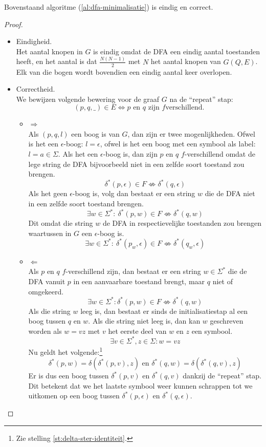 \documentclass[main.tex]{subfiles}
\begin{document}
\begin{st}
  Bovenstaand algoritme (\ref{al:dfa-minimalisatie}) is eindig en correct.
  \begin{proof}
    \begin{itemize}
    \item Eindigheid.\\
    Het aantal knopen in $G$ is eindig omdat de DFA een eindig aantal toestanden heeft, en het aantal is dat $\frac{N(N-1)}{2}$ met $N$ het aantal knopen van $G(Q,E)$.
    Elk van die bogen wordt bovendien een eindig aantal keer overlopen.
    \item Correctheid.\\
      We bewijzen volgende bewering voor de graaf $G$ na de ``repeat'' stap:
      \[ (p,q,\_) \in E \Leftrightarrow p \text{ en } q \text { zijn } f\text{verschillend.}\]
      \begin{itemize}
      \item $\Rightarrow$\\
        Als $(p,q,l)$ een boog is van $G$, dan zijn er twee mogenlijkheden.
        Ofwel is het een $\epsilon$-boog: $l=\epsilon$, ofwel is het een boog met een symbool als label: $l = a \in \Sigma$.
        Als het een $\epsilon$-boog is, dan zijn $p$ en $q$ $f$-verschillend omdat de lege string de DFA bijvoorbeeld niet in een zelfde soort toestand zou brengen.
        \[ \delta^{*}(p,\epsilon) \in F \not\Leftrightarrow \delta^{*}(q,\epsilon) \]
        Als het geen $\epsilon$-boog is, volg dan bestaat er een string $w$ die de DFA niet in een zelfde soort toestand brengen.
        \[ \exists w\in \Sigma^{*}:\ \delta^{*}(p,w) \in F \not\Leftrightarrow \delta^{*}(q,w) \]
        Dit omdat die string $w$ de DFA in respectievelijke toestanden zou brengen waartussen in $G$ een $\epsilon$-boog is.
        \[ \exists w\in \Sigma^{*}:\  \delta^{*}(p_{w},\epsilon) \in F \not\Leftrightarrow \delta^{*}(q_{w},\epsilon) \]
      \item $\Leftarrow$\\
        Als $p$ en $q$ $f$-verschillend zijn, dan bestaat er een string $w\in \Sigma^{*}$ die de DFA vanuit $p$ in een aanvaarbare toestand brengt, maar $q$ niet of omgekeerd.
        \[ \exists w \in \Sigma^{*}: \delta^{*}(p,w) \in F \not\Leftrightarrow \delta^{*}(q,w) \]
        Als die string $w$ leeg is, dan bestaat er sinds de initialisatiestap al een boog tussen $q$ en $w$. Als die string niet leeg is, dan kan $w$ geschreven worden als $w = vz$ met $v$ het eerste deel van $w$ en $z$ een symbool.
        \[ \exists v\in \Sigma^{*}, z \in \Sigma: w = vz \]
        Nu geldt het volgende:\footnote{Zie stelling \ref{st:delta-ster-identiteit}.}
        \[ \delta^{*}(p,w) = \delta(\delta^{*}(p,v),z) \text{ en } \delta^{*}(q,w) = \delta(\delta^{*}(q,v),z)\]
        Er is dus een boog tussen $\delta^{*}(p,v)$ en $\delta^{*}(q,v)$ dankzij de ``repeat'' stap.
        Dit betekent dat we het laatste symbool weer kunnen schrappen tot we uitkomen op een boog tussen $\delta^{*}(p,\epsilon)$ en $\delta^{*}(q,\epsilon)$.
      \end{itemize}
    \end{itemize}
  \end{proof}
\end{st}
\end{document}
